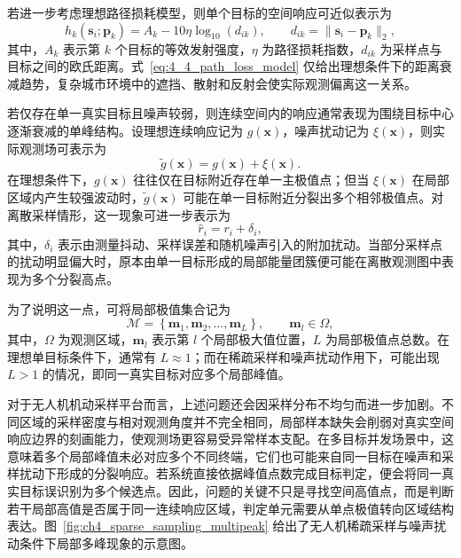 若进一步考虑理想路径损耗模型，则单个目标的空间响应可近似表示为
\begin{equation}
h_k(\mathbf{s}_i;\mathbf{p}_k)
=
A_k
-
10\eta \log_{10}\!\left(d_{ik}\right),
\qquad
d_{ik}=\|\mathbf{s}_i-\mathbf{p}_k\|_2,
\label{eq:4_4_path_loss_model}
\end{equation}
其中，\(A_k\) 表示第 \(k\) 个目标的等效发射强度，\(\eta\) 为路径损耗指数，\(d_{ik}\) 为采样点与目标之间的欧氏距离。式~\eqref{eq:4_4_path_loss_model} 仅给出理想条件下的距离衰减趋势，复杂城市环境中的遮挡、散射和反射会使实际观测偏离这一关系。

若仅存在单一真实目标且噪声较弱，则连续空间内的响应通常表现为围绕目标中心逐渐衰减的单峰结构。设理想连续响应记为 \(g(\mathbf{x})\)，噪声扰动记为 \(\xi(\mathbf{x})\)，则实际观测场可表示为
\begin{equation}
\tilde{g}(\mathbf{x})
=
g(\mathbf{x})+\xi(\mathbf{x}).
\label{eq:4_5_noisy_field}
\end{equation}
在理想条件下，\(g(\mathbf{x})\) 往往仅在目标附近存在单一主极值点；但当 \(\xi(\mathbf{x})\) 在局部区域内产生较强波动时，\(\tilde{g}(\mathbf{x})\) 可能在单一目标附近分裂出多个相邻极值点。对离散采样情形，这一现象可进一步表示为
\begin{equation}
\hat{r}_i
=
r_i+\delta_i,
\label{eq:4_6_sample_perturbation}
\end{equation}
其中，\(\delta_i\) 表示由测量抖动、采样误差和随机噪声引入的附加扰动。当部分采样点的扰动明显偏大时，原本由单一目标形成的局部能量团簇便可能在离散观测图中表现为多个分裂高点。

为了说明这一点，可将局部极值集合记为
\begin{equation}
\mathcal{M}
=
\left\{
\mathbf{m}_1,\mathbf{m}_2,\ldots,\mathbf{m}_L
\right\},
\qquad
\mathbf{m}_l \in \Omega,
\label{eq:4_7_local_maxima_set}
\end{equation}
其中，\(\Omega\) 为观测区域，\(\mathbf{m}_l\) 表示第 \(l\) 个局部极大值位置，\(L\) 为局部极值点总数。在理想单目标条件下，通常有 \(L \approx 1\)；而在稀疏采样和噪声扰动作用下，可能出现 \(L>1\) 的情况，即同一真实目标对应多个局部峰值。

对于无人机机动采样平台而言，上述问题还会因采样分布不均匀而进一步加剧。不同区域的采样密度与相对观测角度并不完全相同，局部样本缺失会削弱对真实空间响应边界的刻画能力，使观测场更容易受异常样本支配。在多目标并发场景中，这意味着多个局部峰值未必对应多个不同终端，它们也可能来自同一目标在噪声和采样扰动下形成的分裂响应。若系统直接依据峰值点数完成目标判定，便会将同一真实目标误识别为多个候选点。因此，问题的关键不只是寻找空间高值点，而是判断若干局部高值是否属于同一连续响应区域，判定单元需要从单点极值转向区域结构表达。图~\ref{fig:ch4_sparse_sampling_multipeak} 给出了无人机稀疏采样与噪声扰动条件下局部多峰现象的示意图。

